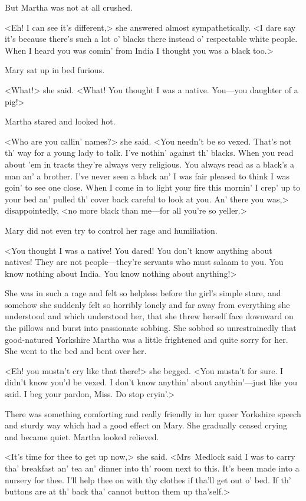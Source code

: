 But Martha was not at all crushed.

<Eh! I can see it's different,> she answered almost sympathetically. <I dare say it's because there's such a lot o' blacks there instead o' respectable white people. When I heard you was comin' from India I thought you was a black too.>

Mary sat up in bed furious.

<What!> she said. <What! You thought I was a native. You—you daughter of a pig!>

Martha stared and looked hot.

<Who are you callin' names?> she said. <You needn't be so vexed. That's not th' way for a young lady to talk. I've nothin' against th' blacks. When you read about 'em in tracts they're always very religious. You always read as a black's a man an' a brother. I've never seen a black an' I was fair pleased to think I was goin' to see one close. When I come in to light your fire this mornin' I crep' up to your bed an' pulled th' cover back careful to look at you. An' there you was,> disappointedly, <no more black than me—for all you're so yeller.>

Mary did not even try to control her rage and humiliation.

<You thought I was a native! You dared! You don't know anything about natives! They are not people—they're servants who must salaam to you. You know nothing about India. You know nothing about anything!>

She was in such a rage and felt so helpless before the girl's simple stare, and somehow she suddenly felt so horribly lonely and far away from everything she understood and which understood her, that she threw herself face downward on the pillows and burst into passionate sobbing. She sobbed so unrestrainedly that good-natured Yorkshire Martha was a little frightened and quite sorry for her. She went to the bed and bent over her.

<Eh! you mustn't cry like that there!> she begged. <You mustn't for sure. I didn't know you'd be vexed. I don't know anythin' about anythin'—just like you said. I beg your pardon, Miss. Do stop cryin'.>

There was something comforting and really friendly in her queer Yorkshire speech and sturdy way which had a good effect on Mary. She gradually ceased crying and became quiet. Martha looked relieved.

<It's time for thee to get up now,> she said. <Mrs~Medlock said I was to carry tha' breakfast an' tea an' dinner into th' room next to this. It's been made into a nursery for thee. I'll help thee on with thy clothes if tha'll get out o' bed. If th' buttons are at th' back tha' cannot button them up tha'self.>

